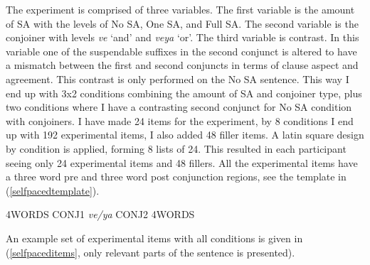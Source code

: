 The experiment is comprised of three variables. The first variable is the amount of SA with the levels of No SA, One SA, and Full SA. The second variable is the conjoiner with levels \textit{ve} `and' and \textit{veya} `or'. The third variable is contrast. In this variable one of the suspendable suffixes in the second conjunct is altered to have a mismatch between the first and second conjuncts in terms of clause aspect and agreement. This contrast is only performed on the No SA sentence. This way I end up with 3x2 conditions combining the amount of SA and conjoiner type, plus two conditions where I have a contrasting second conjunct for No SA condition with conjoiners. I have made 24 items for the experiment, by 8 conditions I end up with 192 experimental items, I also added 48 filler items. A latin square design by condition is applied, forming 8 lists of 24. This resulted in each participant seeing only 24 experimental items and 48 fillers. All the experimental items have a three word pre and three word post conjunction regions, see the template in (\ref{selfpacedtemplate}).  
\begin{exe}
\ex \label{selfpacedtemplate}
4WORDS CONJ1 \textit{ve/ya} CONJ2 4WORDS
\end{exe}

An example set of experimental items with all conditions is given in (\ref{selfpaceditems}, only relevant parts of the sentence is presented).

